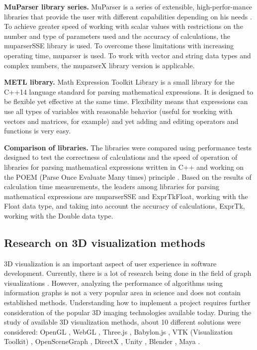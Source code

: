 \textbf{MuParser library series.} MuParser is a series of extensible, high-perfor-mance libraries that provide the user with different capabilities depending on his needs \cite{m19}. To achieve greater speed of working with scalar values with restrictions on the number and type of parameters used and the accuracy of calculations, the muparserSSE library is used. To overcome these limitations with increasing operating time, muparser is used. To work with vector and string data types and complex numbers, the muparserX library version is applicable.

\textbf{METL library.} Math Expression Toolkit Library is a small library for the C++14 language standard for parsing mathematical expressions. It is designed to be flexible yet effective at the same time. Flexibility means that expressions can use all types of variables with reasonable behavior (useful for working with vectors and matrices, for example) and yet adding and editing operators and functions is very easy.

\textbf{Comparison of libraries.} The libraries were compared using performance tests designed to test the correctness of calculations and the speed of operation of libraries for parsing mathematical expressions written in C++ and working on the POEM (Parse Once Evaluate Many times) principle \cite{m22}. Based on the results of calculation time measurements, the leaders among libraries for parsing mathematical expressions are muparserSSE and ExprTkFloat, working with the Float data type, and taking into account the accuracy of calculations, ExprTk, working with the Double data type.

\subsection{Research on 3D visualization methods} 3D visualization is an important aspect of user experience in software development. Currently, there is a lot of research being done in the field of graph visualizations \cite{m23}\cite{m24}\cite{m25}\cite{m26}\cite{m27}. However, analyzing the performance of algorithms using information graphs is not a very popular area in science and does not contain established methods. Understanding how to implement a project requires further consideration of the popular 3D imaging technologies available today. During the study of available 3D visualization methods, about 10 different solutions were considered: OpenGL \cite{m28}, WebGL \cite{m29}\cite{m30}\cite{m31}, Three.js \cite{m32}\cite{m33}, Babylon.js \cite{m34}, VTK (Visualization Toolkit) \cite{m35}, OpenSceneGraph \cite{m36}, DirectX \cite{m37}, Unity \cite{m38}, Blender \cite{m39}, Maya \cite{m40}.

